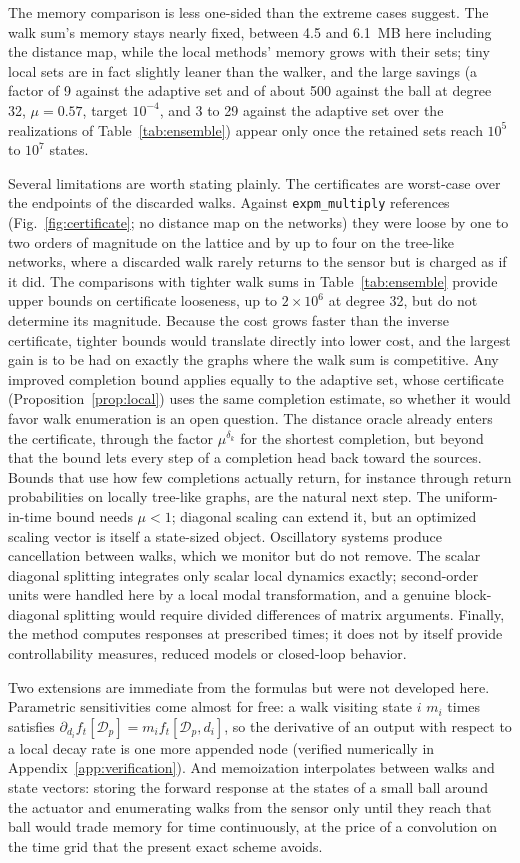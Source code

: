 The memory comparison is less one-sided than the extreme cases suggest. The walk sum's memory stays nearly fixed, between 4.5 and 6.1~MB here including the distance map, while the local methods' memory grows with their sets; tiny local sets are in fact slightly leaner than the walker, and the large savings (a factor of 9 against the adaptive set and of about 500 against the ball at degree 32, $\mu=0.57$, target $10^{-4}$, and 3 to 29 against the adaptive set over the realizations of Table~\ref{tab:ensemble}) appear only once the retained sets reach $10^5$ to $10^7$ states.

Several limitations are worth stating plainly. The certificates are worst-case over the endpoints of the discarded walks. Against \texttt{expm\_multiply} references (Fig.~\ref{fig:certificate}; no distance map on the networks) they were loose by one to two orders of magnitude on the lattice and by up to four on the tree-like networks, where a discarded walk rarely returns to the sensor but is charged as if it did. The comparisons with tighter walk sums in Table~\ref{tab:ensemble} provide upper bounds on certificate looseness, up to $2\times10^6$ at degree 32, but do not determine its magnitude. Because the cost grows faster than the inverse certificate, tighter bounds would translate directly into lower cost, and the largest gain is to be had on exactly the graphs where the walk sum is competitive. Any improved completion bound applies equally to the adaptive set, whose certificate (Proposition~\ref{prop:local}) uses the same completion estimate, so whether it would favor walk enumeration is an open question. The distance oracle already enters the certificate, through the factor $\mu^{\delta_k}$ for the shortest completion, but beyond that the bound lets every step of a completion head back toward the sources. Bounds that use how few completions actually return, for instance through return probabilities on locally tree-like graphs, are the natural next step. The uniform-in-time bound needs $\mu<1$; diagonal scaling can extend it, but an optimized scaling vector is itself a state-sized object. Oscillatory systems produce cancellation between walks, which we monitor but do not remove. The scalar diagonal splitting integrates only scalar local dynamics exactly; second-order units were handled here by a local modal transformation, and a genuine block-diagonal splitting would require divided differences of matrix arguments. Finally, the method computes responses at prescribed times; it does not by itself provide controllability measures, reduced models or closed-loop behavior.

Two extensions are immediate from the formulas but were not developed here. Parametric sensitivities come almost for free: a walk visiting state $i$ $m_i$ times satisfies $\partial_{d_i}f_t[\mathcal{D}_p]=m_if_t[\mathcal{D}_p,d_i]$, so the derivative of an output with respect to a local decay rate is one more appended node (verified numerically in Appendix~\ref{app:verification}). And memoization interpolates between walks and state vectors: storing the forward response at the states of a small ball around the actuator and enumerating walks from the sensor only until they reach that ball would trade memory for time continuously, at the price of a convolution on the time grid that the present exact scheme avoids.
